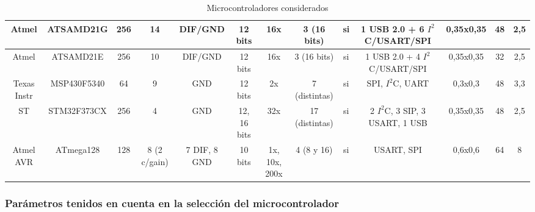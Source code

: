 \begin{landscape}
\begin{table}[!]
\begin{flushleft}
{\begin{tabular}{|c|c|c|c|c|c|c|c|c|c|c|c|c|}
\hline
 Atmel & ATSAMD21G &    256 &     14 & DIF/GND & 12 bits &    16x & 3 (16 bits) &     si & 1 USB 2.0 + 6 $I^{2}$C/USART/SPI & 0,35x0,35 &     48 &    2,5 \\
\hline
 Atmel & ATSAMD21E &    256 &     10 & DIF/GND & 12 bits &    16x & 3 (16 bits) &     si & 1 USB 2.0 + 4 $I^{2}$C/USART/SPI & 0,35x0,35 &     32 &    2,5 \\
\hline
Texas Instr & MSP430F5340 &     64 &      9 &    GND & 12 bits &     2x & 7 (distintas) &     si & SPI, $I^{2}$C, UART & 0,3x0,3 &     48 &    3,3 \\
\hline
    ST & STM32F373CX &    256 &      4 &    GND & 12, 16 bits &    32x & 17 (distintas) &     si & 2 $I^{2}$C, 3 SIP, 3 USART, 1 USB & 0,35x0,35 &     48 &    2,5 \\
\hline
Atmel AVR & ATmega128 &    128 & 8 (2 c/gain) & 7 DIF, 8 GND & 10 bits & 1x, 10x, 200x & 4 (8 y 16) &     si & USART, SPI & 0,6x0,6 &     64 &      8 \\
\hline
\end{tabular}



}
\end{flushleft}
  \caption{Microcontroladores considerados}\label{tabla_micros}
\end{table}

\end{landscape}

\subsubsection{Parámetros tenidos en cuenta en la selección del microcontrolador} %
\label{ssub:parametros_tenidos_en_cuenta_en_la_seleccion_del_microcontrolador}

